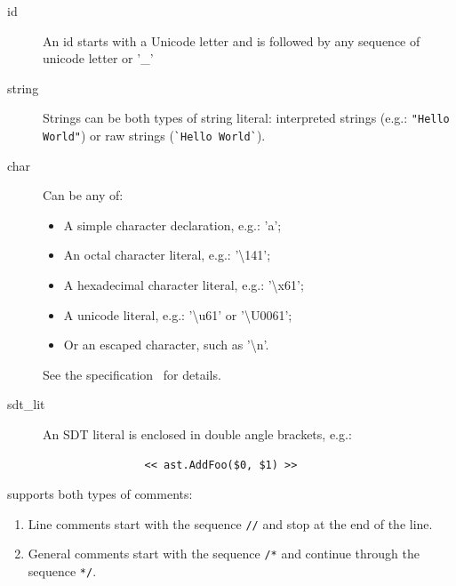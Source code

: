 \documentclass[12pt]{article}
\begin{document}
	\begin{description}
		\item[id] An id starts with a Unicode letter and is followed by any sequence of unicode letter or '\_'

		\item[string] Strings can be both types of \Go string literal: interpreted strings (e.g.: \verb|"Hello World"|) or raw strings (\verb|`Hello World`|).

		\item[char] Can be any of:

			\begin{itemize}
				\item A simple character declaration, e.g.: 'a';
				\item An octal character literal, e.g.: '\textbackslash 141';
				\item A hexadecimal character literal, e.g.: '\textbackslash x61';
				\item A unicode literal, e.g.: '\textbackslash u61' or '\textbackslash U0061';
				\item Or an escaped character, such as '\textbackslash n'.
			\end{itemize}

			See the \Go specification~\cite{gospec} for details.

		\item[sdt\_lit] An SDT literal is enclosed in double angle brackets, e.g.: 
			\begin{verbatim}
				<< ast.AddFoo($0, $1) >>
			\end{verbatim}
	\end{description}

	\gocc supports both types of \Go comments:
	\begin{enumerate}
		\item Line comments start with the sequence \verb|//| and stop at the end of the line.
		\item General comments start with the sequence \verb|/*| and continue through the sequence \verb|*/|.
	\end{enumerate}
		
\end{document}

